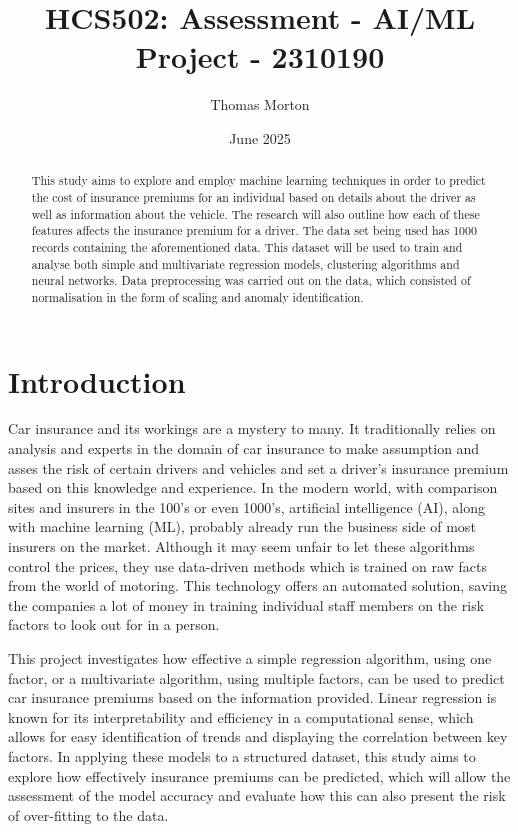 \documentclass{article}
\title{HCS502: Assessment - AI/ML Project - 2310190}
\author{Thomas Morton}
\date{June 2025}
\begin{document}
\maketitle

\begin{abstract}
This study aims to explore and employ machine learning techniques in order to predict the cost of insurance premiums for an individual based on details about the driver as well as information about the vehicle. The research will also outline how each of these features affects the insurance premium for a driver. The data set being used has 1000 records containing the aforementioned data. This dataset will be used to train and analyse both simple and multivariate regression models, clustering algorithms and neural networks. Data preprocessing was carried out on the data, which consisted of normalisation in the form of scaling and anomaly identification.

\end{abstract}

\newpage

\section{Introduction}
Car insurance and its workings are a mystery to many. It traditionally relies on analysis and experts in the domain of car insurance to make assumption and asses the risk of certain drivers and vehicles and set a driver's insurance premium based on this knowledge and experience. In the modern world, with comparison sites and insurers in the 100's or even 1000's, artificial intelligence (AI), along with machine learning (ML), probably already run the business side of most insurers on the market. Although it may seem unfair to let these algorithms control the prices, they use data-driven methods which is trained on raw facts from the world of motoring. This technology offers an automated solution, saving the companies a lot of money in training individual staff members on the risk factors to look out for in a person. 

This project investigates how effective a simple regression algorithm, using one factor, or a multivariate algorithm, using multiple factors, can be used to predict car insurance premiums based on the information provided. Linear regression is known for its interpretability and efficiency in a computational sense\cite{scikit_LR}, which allows for easy identification of trends and displaying the correlation between key factors. In applying these models to a structured dataset, this study aims to explore how effectively insurance premiums can be predicted, which will allow the assessment of the model accuracy and evaluate how this can also present the risk of over-fitting to the data.
\end{document}
